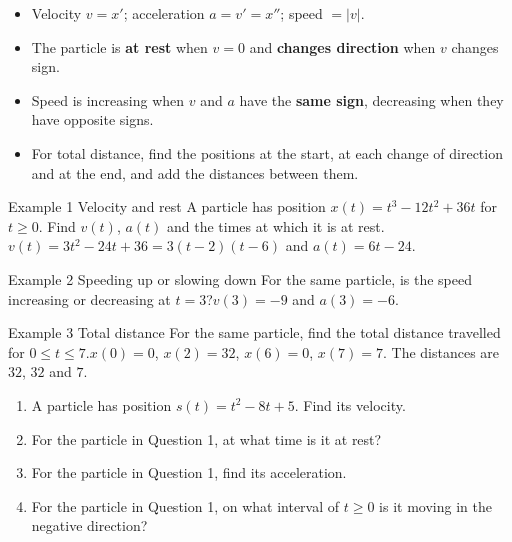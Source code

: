 \documentclass[11pt]{article}
\begin{document}

\begin{ideabox}
\begin{itemize}[leftmargin=*,itemsep=2pt,topsep=2pt]
  \item Velocity $v=x'$; acceleration $a=v'=x''$; speed $=|v|$.
  \item The particle is \textbf{at rest} when $v=0$ and \textbf{changes direction} when $v$ changes sign.
  \item Speed is increasing when $v$ and $a$ have the \textbf{same sign}, decreasing when they have opposite signs.
  \item For total distance, find the positions at the start, at each change of direction and at the end, and add the distances between them.
\end{itemize}
\end{ideabox}

\begin{example}{Example 1 \textperiodcentered{} Velocity and rest}
A particle has position $x(t)=t^3-12t^2+36t$ for $t\ge0$. Find $v(t)$, $a(t)$ and the times at which it is at rest.\soln $v(t)=3t^2-24t+36=3(t-2)(t-6)$ and $a(t)=6t-24$.
\end{example}

\begin{example}{Example 2 \textperiodcentered{} Speeding up or slowing down}
For the same particle, is the speed increasing or decreasing at $t=3$?\soln $v(3)=-9$ and $a(3)=-6$.
\end{example}

\begin{example}{Example 3 \textperiodcentered{} Total distance}
For the same particle, find the total distance travelled for $0\le t\le7$.\soln $x(0)=0$, $x(2)=32$, $x(6)=0$, $x(7)=7$. The distances are $32$, $32$ and $7$.
\end{example}

\newpage
{}

\begin{enumerate}[leftmargin=*,itemsep=2pt]
  \item A particle has position $s(t)=t^2-8t+5$. Find its velocity.\work{2.3cm}
  \item For the particle in Question 1, at what time is it at rest?\work{2.3cm}
  \item For the particle in Question 1, find its acceleration.\work{2.3cm}
  \item For the particle in Question 1, on what interval of $t\ge0$ is it moving in the negative direction?\work{2.3cm}
\end{enumerate}
\end{document}
